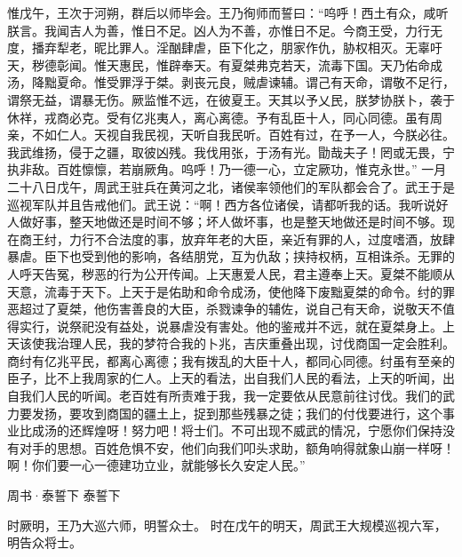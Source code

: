 \documentclass[a4paper,12pt,UTF8,twoside]{ctexbook}
\begin{document}
惟戊午，王次于河朔，群后以师毕会。王乃徇师而誓曰：“呜呼！西土有众，咸听朕言。我闻吉人为善，惟日不足。凶人为不善，亦惟日不足。今商王受，力行无度，播弃犁老，昵比罪人。淫酗肆虐，臣下化之，朋家作仇，胁权相灭。无辜吁天，秽德彰闻。惟天惠民，惟辟奉天。有夏桀弗克若天，流毒下国。天乃佑命成汤，降黜夏命。惟受罪浮于桀。剥丧元良，贼虐谏辅。谓己有天命，谓敬不足行，谓祭无益，谓暴无伤。厥监惟不远，在彼夏王。天其以予乂民，朕梦协朕卜，袭于休祥，戎商必克。受有亿兆夷人，离心离德。予有乱臣十人，同心同德。虽有周亲，不如仁人。天视自我民视，天听自我民听。百姓有过，在予一人，今朕必往。我武维扬，侵于之疆，取彼凶残。我伐用张，于汤有光。勖哉夫子！罔或无畏，宁执非敌。百姓懔懔，若崩厥角。呜呼！乃一德一心，立定厥功，惟克永世。”
一月二十八日戊午，周武王驻兵在黄河之北，诸侯率领他们的军队都会合了。武王于是巡视军队并且告戒他们。武王说：“啊！西方各位诸侯，请都听我的话。我听说好人做好事，整天地做还是时间不够；坏人做坏事，也是整天地做还是时间不够。现在商王纣，力行不合法度的事，放弃年老的大臣，亲近有罪的人，过度嗜酒，放肆暴虐。臣下也受到他的影响，各结朋党，互为仇敌；挟持权柄，互相诛杀。无罪的人呼天告冤，秽恶的行为公开传闻。上天惠爱人民，君主遵奉上天。夏桀不能顺从天意，流毒于天下。上天于是佑助和命令成汤，使他降下废黜夏桀的命令。纣的罪恶超过了夏桀，他伤害善良的大臣，杀戮谏争的辅佐，说自己有天命，说敬天不值得实行，说祭祀没有益处，说暴虐没有害处。他的鉴戒并不远，就在夏桀身上。上天该使我治理人民，我的梦符合我的卜兆，吉庆重叠出现，讨伐商国一定会胜利。商纣有亿兆平民，都离心离德；我有拨乱的大臣十人，都同心同德。纣虽有至亲的臣子，比不上我周家的仁人。上天的看法，出自我们人民的看法，上天的听闻，出自我们人民的听闻。老百姓有所责难于我，我一定要依从民意前往讨伐。我们的武力要发扬，要攻到商国的疆土上，捉到那些残暴之徒；我们的付伐要进行，这个事业比成汤的还辉煌呀！努力吧！将士们。不可出现不威武的情况，宁愿你们保持没有对手的思想。百姓危惧不安，他们向我们叩头求助，额角响得就象山崩一样呀！啊！你们要一心一德建功立业，就能够长久安定人民。”

周书·泰誓下
泰誓下

时厥明，王乃大巡六师，明誓众士。
时在戊午的明天，周武王大规模巡视六军，明告众将士。
\end{document}

